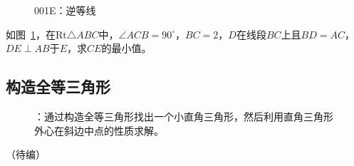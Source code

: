 

\begin{figure}[htbp]
  \centering
  \caption{001E：逆等线} \label{fig:001E}
\end{figure}

如图~\ref{fig:001E}，在$\mathrm{Rt}\triangle ABC$中，$\angle ACB = 90^\circ$，$BC = 2$，$D$在线段$BC$上且$BD = AC$，$DE \perp AB$于$E$，求$CE$的最小值。


\subsection{构造全等三角形} \label{subsec:001E-eq}

\begin{figure}[htbp]
  \centering
  \caption{：通过构造全等三角形找出一个小直角三角形，然后利用直角三角形外心在斜边中点的性质求解。}
  \label{fig:001E-eq}
\end{figure}

（待编）
